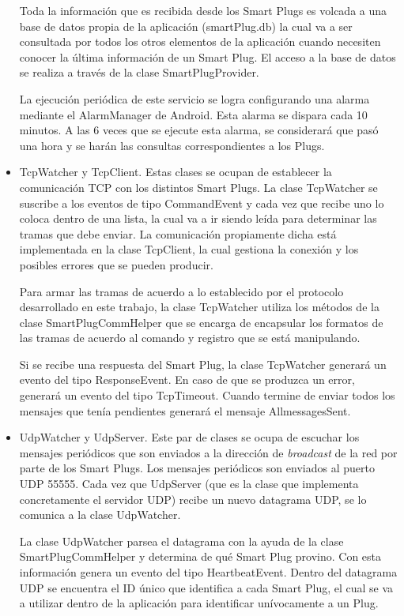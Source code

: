 \begin{itemize}
Toda la información que es recibida desde los Smart Plugs es volcada a una base de datos propia de la aplicación (smartPlug.db) la cual va a ser consultada por todos los otros elementos de la aplicación cuando necesiten conocer la última información de un Smart Plug. El acceso a la base de datos se realiza a través de la clase SmartPlugProvider.

La ejecución periódica de este servicio se logra configurando una alarma mediante el AlarmManager de Android. Esta alarma se dispara cada 10 minutos. A las 6 veces que se ejecute esta alarma, se considerará que pasó una hora y se harán las consultas correspondientes a los Plugs.


\item TcpWatcher y TcpClient. Estas clases se ocupan de establecer la comunicación TCP con los distintos Smart Plugs. La clase TcpWatcher se suscribe a los eventos de tipo CommandEvent y cada vez que recibe uno lo coloca dentro de una lista, la cual va a ir siendo leída para determinar las tramas que debe enviar. La comunicación propiamente dicha está implementada en la clase TcpClient, la cual gestiona la conexión y los posibles errores que se pueden producir. 

Para armar las tramas de acuerdo a lo establecido por el protocolo desarrollado en este trabajo, la clase TcpWatcher utiliza los métodos de la clase SmartPlugCommHelper que se encarga de encapsular los formatos de las tramas de acuerdo al comando y registro que se está manipulando.

Si se recibe una respuesta del Smart Plug, la clase TcpWatcher generará un evento del tipo ResponseEvent. En caso de que se produzca un error, generará un evento del tipo TcpTimeout. Cuando termine de enviar todos los mensajes que tenía pendientes generará el mensaje AllmessagesSent.

\item UdpWatcher y UdpServer. Este par de clases se ocupa de escuchar los mensajes periódicos que son enviados a la dirección de \textit{broadcast} de la red por parte de los Smart Plugs. Los mensajes periódicos son enviados al puerto UDP 55555. Cada vez que UdpServer (que es la clase que implementa concretamente el servidor UDP) recibe un nuevo datagrama UDP, se lo comunica a la clase UdpWatcher.

La clase UdpWatcher parsea el datagrama con la ayuda de la clase SmartPlugCommHelper y determina de qué Smart Plug provino. Con esta información genera un evento del tipo HeartbeatEvent. Dentro del datagrama UDP se encuentra el ID único que identifica a cada Smart Plug, el cual se va a utilizar dentro de la aplicación para identificar unívocamente a un Plug.


\end{itemize}
